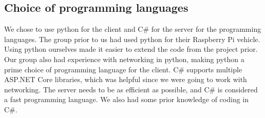 \subsection{Choice of programming languages}
We chose to use python for the client and C# for the server for the programming languages. The group prior to us had used python for their Raspberry Pi vehicle. Using python ourselves made it easier to extend the code from the project prior. Our group also had experience with networking in python, making python a prime choice of programming language for the client. C# supports multiple ASP.NET Core libraries, which was helpful since we were going to work with networking. The server needs to be as efficient as possible, and C# is considered a fast programming language. We also had some prior knowledge of coding in C#.